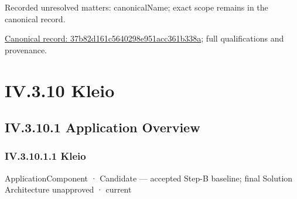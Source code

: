 {\small Recorded unresolved matters: canonicalName; exact scope remains in the canonical record.}\par
{\footnotesize \href{../../../../continuum/application/application-component/37b82d161c5640298e951acc361b338a.md}{Canonical record: 37b82d161c5640298e951acc361b338a}; full qualifications and provenance.}\par
\section*{IV.3.10 Kleio}
\label{navigation:IV.3.10}

\subsection*{IV.3.10.1 Application Overview}
\label{navigation:IV.3.10.1}

\subsubsection*{IV.3.10.1.1 Kleio}
\label{navigation:IV.3.10.1.1}

\label{element:fefda110e2274884ad58906733606efd}
{\small ApplicationComponent · Candidate — accepted Step-B baseline; final Solution Architecture unapproved · current}\par


